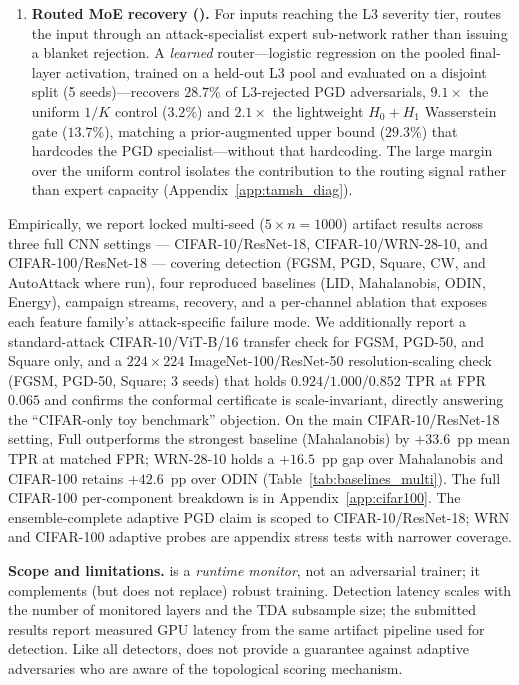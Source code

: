 \begin{enumerate}[leftmargin=*, label=\textbf{C\arabic*}]
\item \textbf{Routed MoE recovery (\tamsh).}
For inputs reaching the L3 severity tier, \prism routes the input through
an attack-specialist expert sub-network rather than issuing a blanket
rejection. A \emph{learned} router---logistic regression on the pooled
final-layer activation, trained on a held-out L3 pool and evaluated on a
disjoint split (5 seeds)---recovers $28.7\%$ of L3-rejected PGD
adversarials, $9.1\times$ the uniform $1/K$ control ($3.2\%$) and
$2.1\times$ the lightweight $H_0{+}H_1$ Wasserstein gate ($13.7\%$),
matching a prior-augmented upper bound ($29.3\%$) that hardcodes the PGD
specialist---without that hardcoding. The large margin over the uniform
control isolates the contribution to the routing signal rather than
expert capacity
(Appendix~\ref{app:tamsh_diag}).

\end{enumerate}

Empirically, we report locked multi-seed ($5{\times}n{=}1000$) artifact
results across three full CNN settings --- CIFAR-10/ResNet-18,
CIFAR-10/WRN-28-10, and CIFAR-100/ResNet-18 --- covering detection
(FGSM, PGD, Square, CW, and AutoAttack where run), four reproduced
baselines (LID, Mahalanobis, ODIN, Energy), campaign streams, recovery,
and a per-channel ablation that exposes each feature family's
attack-specific failure mode. We additionally report a standard-attack
CIFAR-10/ViT-B/16 transfer check for FGSM, PGD-50, and Square only, and a
$224\times224$ ImageNet-100/ResNet-50 resolution-scaling check (FGSM,
PGD-50, Square; 3 seeds) that holds $0.924/1.000/0.852$ TPR at FPR
$0.065$ and confirms the conformal certificate is scale-invariant,
directly answering the ``CIFAR-only toy benchmark'' objection. On the
main CIFAR-10/ResNet-18 setting, \prism Full outperforms the strongest
baseline (Mahalanobis) by $+33.6$~pp mean TPR at matched FPR;
WRN-28-10 holds a $+16.5$~pp gap over Mahalanobis and CIFAR-100 retains
$+42.6$~pp over ODIN (Table~\ref{tab:baselines_multi}). The full
CIFAR-100 per-component breakdown is in Appendix~\ref{app:cifar100}.
The ensemble-complete adaptive PGD claim is scoped to CIFAR-10/ResNet-18;
WRN and CIFAR-100 adaptive probes are appendix stress tests with narrower
coverage.

\textbf{Scope and limitations.}
\prism is a \emph{runtime monitor}, not an adversarial trainer; 
it complements (but does not replace) robust training.
Detection latency scales with the number of monitored layers and the TDA
subsample size; the submitted results report measured GPU latency from the
same artifact pipeline used for detection.
Like all detectors, \prism does not provide a guarantee against 
adaptive adversaries who are aware of the topological scoring mechanism.
